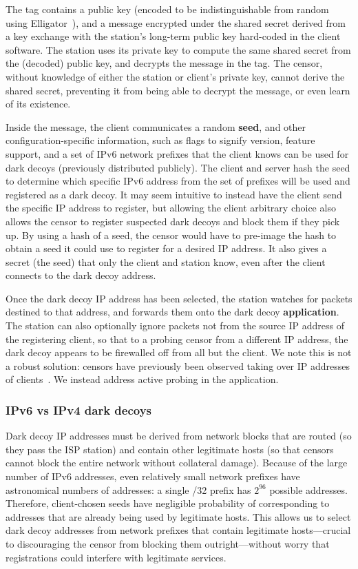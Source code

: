 \documentclass[letterpaper,twocolumn,10pt]{article}
\begin{document}
The tag contains a public key (encoded to be indistinguishable from random using
Elligator~\cite{elligator}), and a message encrypted under the shared secret
derived from a key exchange with the station's long-term public key hard-coded
in the client software. The station uses its private key to compute the same
shared secret from the (decoded) public key, and decrypts the message in the
tag. The censor, without knowledge of either the station or client's private
key, cannot derive the shared secret, preventing it from being able to decrypt
the message, or even learn of its existence.


Inside the message, the client communicates a random \textbf{seed}, and other
configuration-specific information, such as flags to signify version, feature
support, and a set of IPv6 network prefixes that the client knows can be used
for dark decoys (previously distributed publicly).
The client and server hash the seed to determine which specific
IPv6 address from the set of prefixes will be used and registered as a dark
decoy. It may seem intuitive to instead have the client
send the specific IP address to register, but allowing the client arbitrary
choice also allows the censor to register suspected dark decoys and block them if
they pick up. 
By using a hash of a seed, the censor would have to pre-image the hash to
obtain a seed it could use to register for a desired IP address.
It also gives a
secret (the seed) that only the client and station know, even after the client
connects to the dark decoy address.

Once the dark decoy IP address has been selected, the station watches for
packets destined to that address, and forwards them onto the dark decoy
\textbf{application}. The station can also optionally ignore packets not from
the source IP address of the registering client, so that to a probing censor
from a different IP address,
the dark decoy appears to be firewalled off from all but the client. We note
this is not a robust solution: censors have previously been observed taking over
IP addresses of clients~\cite{ensafi-tor}. We instead address active probing in
the application.

\subsubsection{IPv6 vs IPv4 dark decoys}


Dark decoy IP addresses must be derived from network blocks that are routed (so they pass
the ISP station) and contain other legitimate hosts (so that censors cannot
block the entire network without collateral damage).
Because of the large number of IPv6 addresses, even
relatively small network prefixes have astronomical numbers of addresses: a
single /32 prefix has $2^{96}$ possible addresses. Therefore, client-chosen
seeds have negligible probability of corresponding to addresses that are already
being used by legitimate hosts. This allows us to select dark decoy addresses
from network prefixes that contain
legitimate hosts---crucial to discouraging the censor from blocking them
outright---without worry that registrations could interfere with legitimate
services.
\end{document}
